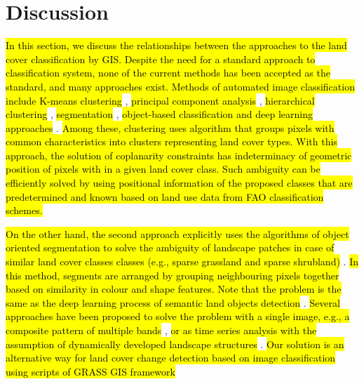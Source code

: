 \documentclass[asi,article,submit,pdftex,moreauthors]{Definitions/mdpi}
\begin{document}
\section{Discussion}

\hl{In this section, we discuss the relationships between the approaches to the land cover classification by GIS. Despite the need for a standard approach to classification system, none of the current methods has been accepted as the standard, and many approaches exist. Methods of automated image classification include K-means clustering} \cite{PAOLAPATRICIA2020129}, \hl{principal component analysis} \cite{SHARMA2023100963}, \hl{hierarchical clustering} \cite{ZHANG2023129590}, \hl{segmentation} \cite{rs15082027}, \hl{object-based classification and deep learning approaches} \cite{ijgi12010014}. \hl{Among these, clustering uses algorithm that groups pixels with common characteristics into clusters representing land cover types. With this approach, the solution of coplanarity constraints has indeterminacy of geometric position of pixels with in a given land cover class. Such ambiguity can be efficiently solved by using positional information of the proposed classes that are predetermined and known based on land use data from FAO classification schemes.}

\hl{On the other hand, the second approach explicitly uses the algorithms of object oriented segmentation to solve the ambiguity of landscape patches in case of similar land cover classes classes (e.g., sparse grassland and sparse shrubland)} \cite{Lilay}. \hl{In this method, segments are arranged by grouping neighbouring pixels together based on similarity in colour and shape features. Note that the problem is the same as the deep learning process of semantic land objects detection} \cite{Yang,Kattenborn,LI2021105763}. \hl{Several approaches have been proposed to solve the problem with a single image, e.g., a composite pattern of multiple bands} \cite{SEYDI2023112961}, \hl{or as time series analysis with the assumption of dynamically developed landscape structures} \cite{YE2023113462}. \hl{Our solution is an alternative way for land cover change detection based on image classification using scripts of GRASS GIS framework}
\end{document}
